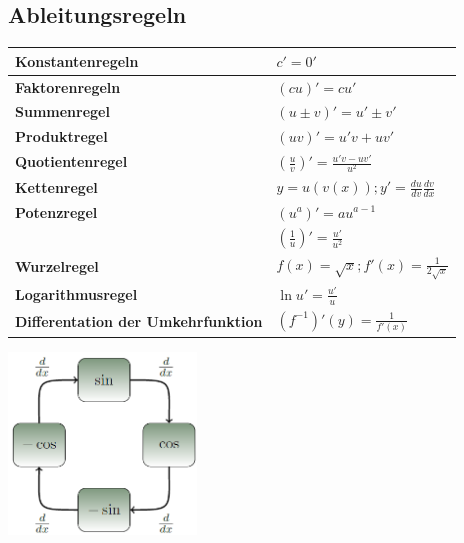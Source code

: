 \subsection{Ableitungsregeln}
\renewcommand{\arraystretch}{1.5}
\begin{tabular}{|l|l|}
	\hline \textbf{Konstantenregeln}& $c'=0'$\\
	\hline \textbf{Faktorenregeln}& $(cu)'=c u'$\\
	\hline \textbf{Summenregel}& $(u\pm v)'= u' \pm v'$\\
	\hline \textbf{Produktregel}& $(uv)'=u'v + uv'$\\
	\hline \textbf{Quotientenregel}& $(\frac{u}{v})'= \frac{u'v-uv'}{u^{2}}$\\
	\hline \textbf{Kettenregel}& $y=u(v(x)) ; y'=\frac{du}{dv} \frac{dv}{dx}$\\
	\hline \textbf{Potenzregel} & $(u^{a})'=au^{a-1}$\\
								& $(\frac{1}{u})'= \frac{u'}{u^2}$\\
	\hline	\textbf{Wurzelregel} & $f(x)=\sqrt{x} ; f'(x)=\frac{1}{2\sqrt{x}}$\\
	\hline	\textbf{Logarithmusregel} & $\ln{u}'=\frac{u'}{u}$\\ 
	\hline	\textbf{Differentation der Umkehrfunktion} & $(f^{-1})'(y)=\frac{1}{f'(x)} $\\
	\hline 
\end{tabular}
\includegraphics[width=5cm]{images/sin_cos.png}
\newpage
